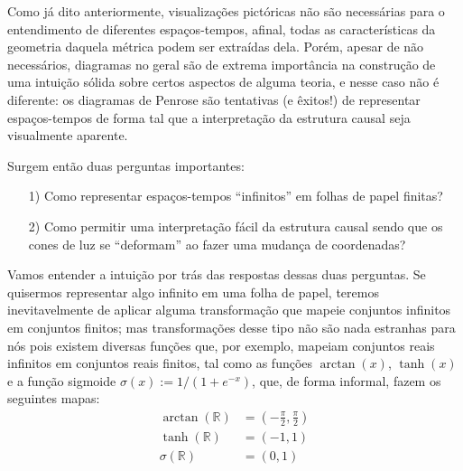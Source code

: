Como já dito anteriormente, visualizações pictóricas não são necessárias para o entendimento de diferentes espaços-tempos,
afinal, todas as características da geometria daquela métrica podem ser extraídas dela.
Porém, apesar de não necessários, diagramas no geral são de extrema importância na construção
de uma intuição sólida sobre certos aspectos de alguma teoria, e nesse caso não é diferente:
os diagramas de Penrose são tentativas (e êxitos!) de representar espaços-tempos de forma tal
que a interpretação da estrutura causal seja visualmente aparente.

Surgem então duas perguntas importantes: 
\begin{itemize}
    \item [1)]Como representar espaços-tempos ``infinitos'' em folhas de papel finitas?
    \item [2)]Como permitir uma interpretação fácil da estrutura causal sendo que os cones de luz se ``deformam'' ao fazer uma mudança de coordenadas?
\end{itemize}
Vamos entender a intuição por trás das respostas dessas duas perguntas. Se quisermos representar algo infinito em uma folha de papel, teremos inevitavelmente de aplicar alguma transformação que mapeie conjuntos infinitos em conjuntos finitos; mas transformações desse tipo não são nada estranhas para nós pois existem diversas funções que, por exemplo, mapeiam conjuntos reais infinitos em conjuntos reais finitos, tal como as funções $\arctan(x)$, $\tanh(x)$ e a função sigmoide $\sigma(x):=1/(1+e^{-x})$, que, de forma informal, fazem os seguintes mapas:
\begin{align*}
    \arctan(\mathbb{R})&=\left(-\frac{\pi}{2}, \frac{\pi}{2}\right)\\
    \tanh(\mathbb{R})&=\left(-1, 1\right)\\
    \sigma(\mathbb{R})&=\left(0, 1\right)
\end{align*}

